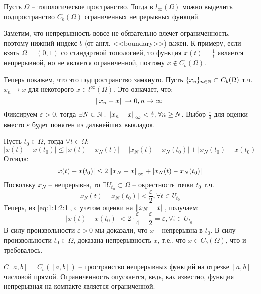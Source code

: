\documentclass[../main.tex]{subfiles}
\begin{document}
\begin{example}
	Пусть $\Omega$ -- топологическое пространство. Тогда в $l_\infty (\Omega)$ можно выделить подпространство $C_b (\Omega)$ ограниченных непрерывных функций. 
	
	Заметим, что непрерывность вовсе не обязательно влечет ограниченность, поэтому нижний индекс $b$ (от англ. <<boundary>>) важен. К примеру, если взять $\Omega = (0, 1)$ со стандартной топологией, то функция $x(t) = \frac{1}{t}$ является непрерывной, но не является ограниченной, поэтому $x \notin C_b (\Omega)$.
	
	Теперь покажем, что это подпространство замкнуто. Пусть $\{x_n\}_{n\in\mathbb{N}} \subset C_b (\Omega)$ т.ч. $x_n \to x$ для некоторого $x \in l^\infty (\Omega)$. Это означает, что:
	\begin{equation*}
		\left\| x_n - x \right\| \to 0, n \to \infty
	\end{equation*}
	Фиксируем $\varepsilon > 0$, тогда $\exists N \in \mathbb{N}: \left\| x_n - x \right\|_\infty < \frac{\varepsilon}{4}, \forall n \geq N$. Выбор $\frac{\varepsilon}{4}$ для оценки вместо $\varepsilon$ будет понятен из дальнейших выкладок. 
	
	Пусть $t_0 \in \Omega$, тогда $\forall t \in \Omega$:
	\begin{equation*}
		|x(t) - x(t_0)| \leq |x(t) - x_N (t)| + |x_N (t) - x_N (t_0)| + |x_N(t_0) - x(t_0)|
	\end{equation*}
	Отсюда:
	\begin{equation}\label{eq:1:1:2:1}
		|x(t) - x(t_0)| \leq 2\left\| x_N - x \right\|_\infty + |x_N (t) - x_N (t_0)|
	\end{equation}
	Поскольку $x_N$ -- непрерывна, то $\exists U_{t_0} \subset \Omega$ -- окрестность точки $t_0$ т.ч. 
	$$|x_N (t) - x_N (t_0)| < \frac{\varepsilon}{2}, \forall t \in U_{t_0}$$
	Теперь, из \eqref{eq:1:1:2:1}, с учетом оценки на $\left\| x_N - x \right\|$, получаем:
	\begin{equation*}
		|x(t) - x(t_0)| < 2 \cdot \frac{\varepsilon}{4} + \frac{\varepsilon}{2} = \varepsilon, \forall t \in U_{t_0}
	\end{equation*}
	В силу произвольности $\varepsilon > 0$ мы доказали, что $x$ -- непрерывна в $t_0$. В силу произвольности $t_0 \in \Omega$, доказана непрерывность $x$, т.е., что $x \in C_b (\Omega)$, что и требовалось.
\end{example}

\begin{example}
	$C[a, b] = C_b ([a, b])$ -- пространство непрерывных функций на отрезке $[a, b]$ числовой прямой. Ограниченность опускается, ведь, как известно, функция непрерывная на компакте является ограниченной.
\end{example}
\end{document}
